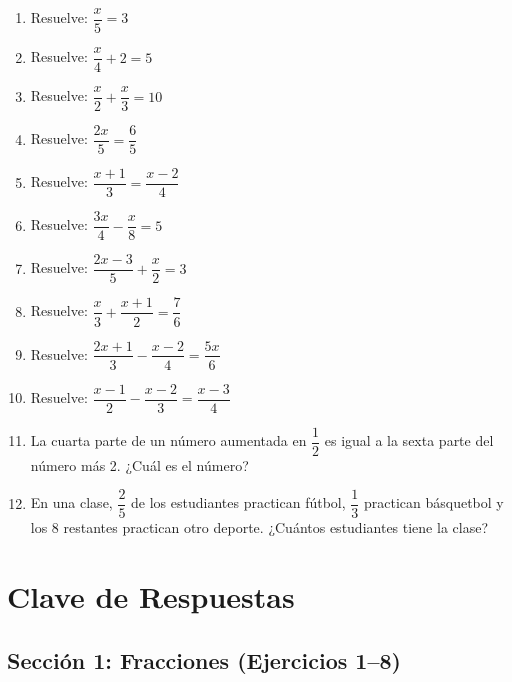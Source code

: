 \documentclass[12pt, letterpaper]{article}
\begin{document}
\begin{enumerate}[leftmargin=*, resume]
  \item \facil{} Resuelve: $\dfrac{x}{5} = 3$

  \item \facil{} Resuelve: $\dfrac{x}{4} + 2 = 5$

  \item \facil{} Resuelve: $\dfrac{x}{2} + \dfrac{x}{3} = 10$

  \item \facil{} Resuelve: $\dfrac{2x}{5} = \dfrac{6}{5}$

  \item \medio{} Resuelve: $\dfrac{x + 1}{3} = \dfrac{x - 2}{4}$

  \item \medio{} Resuelve: $\dfrac{3x}{4} - \dfrac{x}{8} = 5$

  \item \medio{} Resuelve: $\dfrac{2x - 3}{5} + \dfrac{x}{2} = 3$

  \item \medio{} Resuelve: $\dfrac{x}{3} + \dfrac{x + 1}{2} = \dfrac{7}{6}$

  \item \medio{} Resuelve: $\dfrac{2x + 1}{3} - \dfrac{x - 2}{4} = \dfrac{5x}{6}$

  \item \dificil{} Resuelve: $\dfrac{x - 1}{2} - \dfrac{x - 2}{3} = \dfrac{x - 3}{4}$

  \item \dificil{} La cuarta parte de un número aumentada en $\dfrac{1}{2}$ es igual a la sexta parte del número más 2. ¿Cuál es el número?

  \item \dificil{} En una clase, $\dfrac{2}{5}$ de los estudiantes practican fútbol, $\dfrac{1}{3}$ practican básquetbol y los 8 restantes practican otro deporte. ¿Cuántos estudiantes tiene la clase?
\end{enumerate}

\newpage

\ifmwclaves
  \section{Clave de Respuestas}

  \subsection*{Sección 1: Fracciones (Ejercicios 1--8)}
\end{document}
